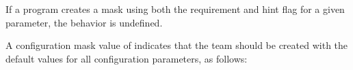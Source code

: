 \begin{apidefinition}
{  If a program creates a mask using both the requirement and hint flag
  for a given parameter, the behavior is undefined.

   A configuration mask value of  indicates that the team
   should be created with the default values for all configuration
   parameters, as follows:

  {
  }

  }


\end{apidefinition}
